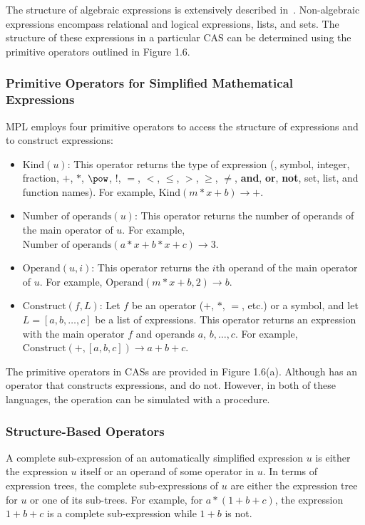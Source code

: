 The structure of algebraic expressions is extensively described in~\cite{cohen2002computer, cohen2003omputer}. Non-algebraic expressions encompass relational and logical expressions, lists, and sets. The structure of these expressions in a particular \ac{CAS} can be determined using the primitive operators outlined in Figure 1.6.

\subsubsection{Primitive Operators for Simplified Mathematical Expressions}

\ac{MPL} employs four primitive operators to access the structure of expressions and to construct expressions:
%
\begin{itemize}
  \setlength{\itemsep}{0.0em}
  \item $\text{Kind}(u)$: This operator returns the type of expression (\eg{}, symbol, integer, fraction, $+$, $*$, $\pow$, $!$, $=$, $<$, $\leq$, $>$, $\geq$, $\neq$, \textbf{and}, \textbf{or}, \textbf{not}, set, list, and function names). For example, $\text{Kind}(m*x+b) \rightarrow +$.
  \item $\text{Number of operands}(u)$: This operator returns the number of operands of the main operator of $u$. For example, $\text{Number of operands}(a*x+b*x+c) \rightarrow 3$.
  \item $\text{Operand}(u,i)$: This operator returns the $i$th operand of the main operator of $u$. For example, $\text{Operand}(m*x+b,2) \rightarrow b$.
  \item $\text{Construct}(f,L)$: Let $f$ be an operator ($+$, $*$, $=$, etc.) or a symbol, and let $L = [a, b, \dots, c]$ be a list of expressions. This operator returns an expression with the main operator $f$ and operands $a$, $b, \dots, c$. For example, $\text{Construct}(+, [a, b, c]) \rightarrow a + b + c$.
\end{itemize}

The primitive operators in \acp{CAS} are provided in Figure 1.6(a). Although \Mathematica{} has an operator that constructs expressions, \Maple{} and \MuPAD{} do not. However, in both of these languages, the operation can be simulated with a procedure.

\subsubsection{Structure-Based Operators}

A complete sub-expression of an automatically simplified expression $u$ is either the expression $u$ itself or an operand of some operator in $u$. In terms of expression trees, the complete sub-expressions of $u$ are either the expression tree for $u$ or one of its sub-trees. For example, for $a*(1+b+c)$, the expression $1+b+c$ is a complete sub-expression while $1+b$ is not.

